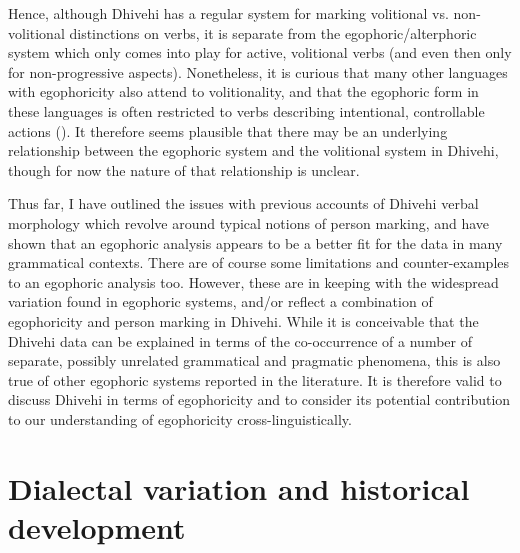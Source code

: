 \documentclass[output=paper]{langsci/langscibook}
\begin{document}
Hence, although Dhivehi has a regular system for marking volitional vs. non-volitional distinctions on verbs, it is separate from the egophoric/alterphoric system which only comes into play for active, volitional verbs (and even then only for non-progressive aspects). Nonetheless, it is curious that many other languages with egophoricity also attend to volitionality, and that the egophoric form in these languages is often restricted to verbs describing intentional, controllable actions (\citealt[14–15, 29–30]{SanRoque2018}). It therefore seems plausible that there may be an underlying relationship between the egophoric system and the volitional system in Dhivehi, though for now the nature of that relationship is unclear. 

   Thus far, I have outlined the issues with previous accounts of Dhivehi verbal morphology which revolve around typical notions of person marking, and have shown that an egophoric analysis appears to be a better fit for the data in many grammatical contexts. There are of course some limitations and counter-examples to an egophoric analysis too. However, these are in keeping with the widespread variation found in egophoric systems, and/or reflect a combination of egophoricity and person marking in Dhivehi. While it is conceivable that the Dhivehi data can be explained in terms of the co-occurrence of a number of separate, possibly unrelated grammatical and pragmatic phenomena, this is also true of other egophoric systems reported in the literature. It is therefore valid to discuss Dhivehi in terms of egophoricity and to consider its potential contribution to our understanding of egophoricity cross-linguistically.

\section{Dialectal variation and historical development}\label{s:jl4}
\end{document}
